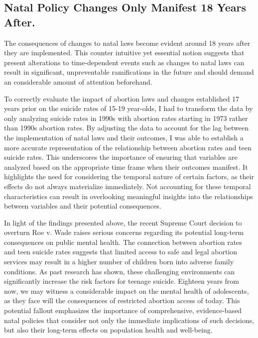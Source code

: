 \documentclass[
  letterpaper,
  DIV=11,
  numbers=noendperiod]{scrartcl}
\begin{document}
\hypertarget{natal-policy-changes-only-manifest-18-years-after.}{%
\subsection{Natal Policy Changes Only Manifest 18 Years
After.}\label{natal-policy-changes-only-manifest-18-years-after.}}

The consequences of changes to natal laws become evident around 18 years
after they are implemented. This counter intuitive yet essential notion
suggests that present alterations to time-dependent events such as
changes to natal laws can result in significant, unpreventable
ramifications in the future and should demand an considerable amount of
attention beforehand.

To correctly evaluate the impact of abortion laws and changes
established 17 years prior on the suicide rates of 15-19 year-olds, I
had to transform the data by only analyzing suicide rates in 1990s with
abortion rates starting in 1973 rather than 1990s abortion rates. By
adjusting the data to account for the lag between the implementation of
natal laws and their outcomes, I was able to establish a more accurate
representation of the relationship between abortion rates and teen
suicide rates. This underscores the importance of ensuring that
variables are analyzed based on the appropriate time frame when their
outcomes manifest. It highlights the need for considering the temporal
nature of certain factors, as their effects do not always materialize
immediately. Not accounting for these temporal characteristics can
result in overlooking meaningful insights into the relationships between
variables and their potential consequences.

In light of the findings presented above, the recent Supreme Court
decision to overturn Roe v. Wade raises serious concerns regarding its
potential long-term consequences on public mental health. The connection
between abortion rates and teen suicide rates suggests that limited
access to safe and legal abortion services may result in a higher number
of children born into adverse family conditions. As past research has
shown, these challenging environments can significantly increase the
risk factors for teenage suicide. Eighteen years from now, we may
witness a considerable impact on the mental health of adolescents, as
they face will the consequences of restricted abortion access of today.
This potential fallout emphasizes the importance of comprehensive,
evidence-based natal policies that consider not only the immediate
implications of such decisions, but also their long-term effects on
population health and well-being.
\end{document}
